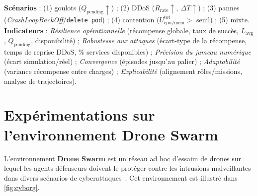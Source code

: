 \textbf{Scénarios} : (1) goulots (\(Q_{\text{pending}}\uparrow\)) ; (2) DDoS (\(R_{\text{rate}}\uparrow,\ \Delta T\uparrow\)) ; (3) pannes (\textit{CrashLoopBackOff}/\texttt{delete pod}) ; (4) contention (\(U_{\text{cpu/mem}}^{\text{tot}}>\) seuil) ; (5) mixte. \textbf{Indicateurs} : \emph{Résilience opérationnelle} (récompense globale, taux de succès, \(L_{\text{avg}}\), \(\overline{Q_{\text{pending}}}\), disponibilité) ; \emph{Robustesse aux attaques} (écart-type de la récompense, temps de reprise DDoS, \% services disponibles) ; \emph{Précision du jumeau numérique} (écart simulation/réel) ; \emph{Convergence} (épisodes jusqu'au palier) ; \emph{Adaptabilité} (variance récompense entre charges) ; \emph{Explicabilité} (alignement rôles/missions, analyse de trajectoires).




\section{Expérimentations sur l'environnement Drone Swarm}

L'environnement \textbf{Drone Swarm} est un réseau ad hoc d'essaim de drones sur lequel les agents défenseurs doivent le protéger contre les intrusions malveillantes dans divers scénarios de cyberattaques~\cite{Standen2021}. Cet environnement est illustré dans \autoref{fig:cyborg}.

